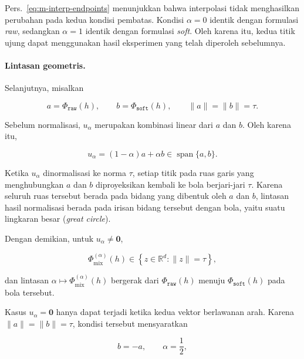 Pers.~\eqref{eq:m-interp-endpoints} menunjukkan bahwa interpolasi tidak
menghasilkan perubahan pada kedua kondisi pembatas. Kondisi $\alpha=0$
identik dengan formulasi \textit{raw}, sedangkan $\alpha=1$ identik dengan
formulasi \textit{soft}. Oleh karena itu, kedua titik ujung dapat menggunakan
hasil eksperimen yang telah diperoleh sebelumnya.

\paragraph{Lintasan geometris.}

Selanjutnya, misalkan

\begin{equation}
a=\Phi_{\texttt{raw}}(h),
\qquad
b=\Phi_{\texttt{soft}}(h),
\qquad
\lVert a\rVert=\lVert b\rVert=\tau.
\label{eq:m-interp-ab}
\end{equation}

Sebelum normalisasi, $u_\alpha$ merupakan kombinasi linear dari $a$ dan $b$.
Oleh karena itu,

\begin{equation}
u_\alpha
=
(1-\alpha)a+\alpha b
\in
\operatorname{span}\{a,b\}.
\label{eq:m-interp-span}
\end{equation}

Ketika $u_\alpha$ dinormalisasi ke norma $\tau$, setiap titik pada ruas garis
yang menghubungkan $a$ dan $b$ diproyeksikan kembali ke bola berjari-jari
$\tau$. Karena seluruh ruas tersebut berada pada bidang yang dibentuk oleh
$a$ dan $b$, lintasan hasil normalisasi berada pada irisan bidang tersebut
dengan bola, yaitu suatu lingkaran besar (\textit{great circle}).

Dengan demikian, untuk $u_\alpha\neq\mathbf{0}$,

\begin{equation}
\Phi_{\mathrm{mix}}^{(\alpha)}(h)
\in
\left\{
z\in\mathbb{R}^{d}
:
\lVert z\rVert=\tau
\right\},
\label{eq:m-interp-sphere}
\end{equation}

dan lintasan $\alpha\mapsto\Phi_{\mathrm{mix}}^{(\alpha)}(h)$ bergerak dari
$\Phi_{\texttt{raw}}(h)$ menuju $\Phi_{\texttt{soft}}(h)$ pada bola tersebut.

Kasus $u_\alpha=\mathbf{0}$ hanya dapat terjadi ketika kedua vektor berlawanan
arah. Karena $\lVert a\rVert=\lVert b\rVert=\tau$, kondisi tersebut mensyaratkan

\begin{equation}
b=-a,
\qquad
\alpha=\frac12,
\label{eq:m-interp-zero}
\end{equation}


